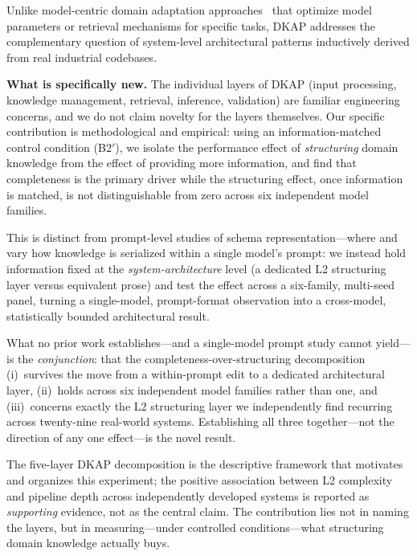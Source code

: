 \documentclass[fleqn,10pt,lineno]{wlpeerj}
\begin{document}
Unlike model-centric domain adaptation approaches~\citep{wang2018domain,selfrag,radit} that optimize model parameters or retrieval mechanisms for specific tasks, DKAP addresses the complementary question of system-level architectural patterns inductively derived from real industrial codebases.

\textbf{What is specifically new.} The individual layers of DKAP (input processing, knowledge management, retrieval, inference, validation) are familiar engineering concerns, and we do not claim novelty for the layers themselves. Our specific contribution is methodological and empirical: using an information-matched control condition (B2$'$), we isolate the performance effect of \textit{structuring} domain knowledge from the effect of providing more information, and find that completeness is the primary driver while the structuring effect, once information is matched, is not distinguishable from zero across six independent model families.

This is distinct from prompt-level studies of schema representation---where \citet{maamari2024death} and \citet{zhang2026samecontent} vary how knowledge is serialized within a single model's prompt: we instead hold information fixed at the \textit{system-architecture} level (a dedicated L2 structuring layer versus equivalent prose) and test the effect across a six-family, multi-seed panel, turning a single-model, prompt-format observation into a cross-model, statistically bounded architectural result.

What no prior work establishes---and a single-model prompt study cannot yield---is the \textit{conjunction}: that the completeness-over-structuring decomposition (i)~survives the move from a within-prompt edit to a dedicated architectural layer, (ii)~holds across six independent model families rather than one, and (iii)~concerns exactly the L2 structuring layer we independently find recurring across twenty-nine real-world systems. Establishing all three together---not the direction of any one effect---is the novel result.

The five-layer DKAP decomposition is the descriptive framework that motivates and organizes this experiment; the positive association between L2 complexity and pipeline depth across independently developed systems is reported as \textit{supporting} evidence, not as the central claim. The contribution lies not in naming the layers, but in measuring---under controlled conditions---what structuring domain knowledge actually buys.
\end{document}
